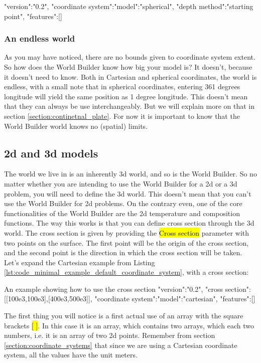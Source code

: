 \documentclass{book}
\newcommand{\WB}{{World Builder}}
\begin{document}
\begin{javascriptcode}{}{}
{
  "version":"0.2",
  "coordinate system":{"model":"spherical", "depth method":"starting point"},
  "features":[]
}
\end{javascriptcode}


\subsubsection{An endless world}
As you may have noticed, there are no bounds given to coordinate system extent. So how does the \WB{} know how big your model is? It doesn't, because it doesn't need to know. Both in Cartesian and spherical coordinates, the world is endless, with a small note that in spherical coordinates, entering 361 degrees longitude will yield the same position as 1 degree longitude. This doesn't mean that they can always be use interchangeably. But we will explain more on that in section \ref{section:continetnal_plate}. For now it is important to know that the \WB{} world knows no (spatial) limits.

\subsection{2d and 3d models}
The world we live in is an inherently 3d world, and so is the \WB{}. So no matter whether you are intending to use the \WB{} for a 2d or a 3d problem, you will need to define the 3d world. This doesn't mean that you can't use the \WB{} for 2d problems. On the contrary even, one of the core functionalities of the \WB{} are the 2d temperature and composition functions. The way this works is that you can define cross section through the 3d world. The cross section is given by providing the \hl{Cross section} parameter with two points on the surface. The first point will be the origin of the cross section, and the second point is the direction in which the cross section will be taken. Let's expand the Cartesian example from Listing \ref{lst:code_minimal_example_default_coordinate_system}, with a cross section:

\begin{javascriptcode}{An example showing how to use the cross section}{}
{
  "version":"0.2",
  "cross section":[[100e3,100e3],[400e3,500e3]],
  "coordinate system":{"model":"cartesian"},
  "features":[]
}
\end{javascriptcode}

The first thing you will notice is a first actual use of an array with the square brackets \hl{[ ]}. In this case it is an array, which contains two arrays, which each two numbers, i.e. it is an array of two 2d points. Remember from section \ref{section:coordinate_systems} that since we are using a Cartesian coordinate system, all the values have the unit meters. 
\end{document}
